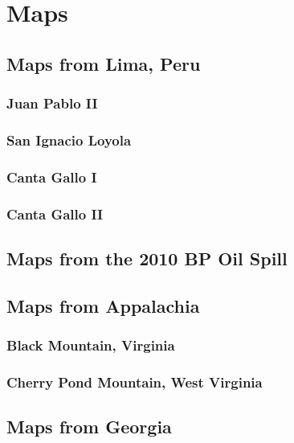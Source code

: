 \documentclass[11pt,oneside,notitlepage]{report}
\begin{document}
\appendix

\chapter{Maps}

\section{Maps from Lima, Peru}

\subsection{Juan Pablo II}

\subsection{San Ignacio Loyola}

\subsection{Canta Gallo I}

\subsection{Canta Gallo II}

\section{Maps from the 2010 BP Oil Spill}



\section{Maps from Appalachia}

\subsection{Black Mountain, Virginia}

\subsection{Cherry Pond Mountain, West Virginia}

\section{Maps from Georgia}
\end{document}
